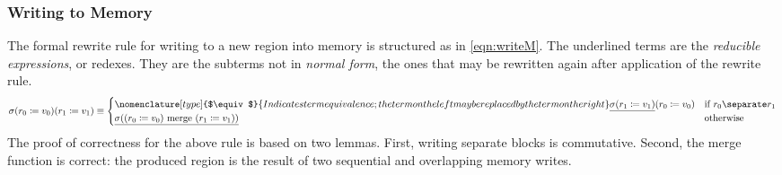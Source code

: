 \subsubsection{Writing to Memory}
The formal rewrite rule for writing to a new region into memory
is structured as in \cref{eqn:writeM}.
The underlined terms are the \emph{reducible expressions},%
or redexes.
They are the subterms not in \emph{normal form},%
the ones that may be rewritten again after application of the rewrite rule.
\begin{equation}
  \sigma(r_0\coloneqq v_0)(r_1\coloneqq v_1)\equiv\begin{cases}%
  \nomenclature[type]{$\equiv$}{Indicates term equivalence;
    the term on the left may be replaced by the term on the right}
    \underline{\sigma(r_1\coloneqq v_1)}(r_0\coloneqq v_0) &
      \text{if } r_0\separate r_1 \\
    \underline{\sigma((r_0\coloneqq v_0)\mmerge(r_1\coloneqq v_1))} &
      \text{otherwise}
  \end{cases}\label{eqn:writeM}
\end{equation}
The proof of correctness for the above rule is based on two lemmas.
First, writing separate blocks is commutative.
Second, the merge function is correct:
the produced region is the result of two sequential and overlapping memory writes.


